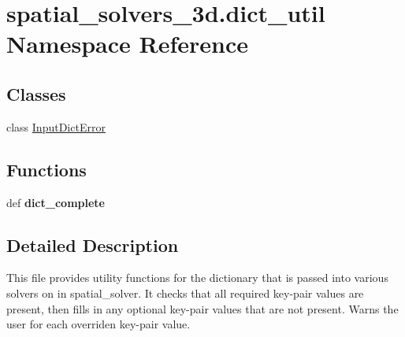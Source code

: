 \hypertarget{namespacespatial__solvers__3d_1_1dict__util}{\section{spatial\+\_\+solvers\+\_\+3d.\+dict\+\_\+util Namespace Reference}
\label{namespacespatial__solvers__3d_1_1dict__util}
}
\subsection*{Classes}
\begin{DoxyCompactItemize}
\item 
class \hyperlink{classspatial__solvers__3d_1_1dict__util_1_1_input_dict_error}{Input\+Dict\+Error}
\end{DoxyCompactItemize}
\subsection*{Functions}
\begin{DoxyCompactItemize}
\item 
\hypertarget{namespacespatial__solvers__3d_1_1dict__util_a516778afe95b5802406c43f47f0fd181}{def {\bfseries dict\+\_\+complete}}\label{namespacespatial__solvers__3d_1_1dict__util_a516778afe95b5802406c43f47f0fd181}

\end{DoxyCompactItemize}


\subsection{Detailed Description}
\begin{DoxyVerb}This file provides utility functions for the dictionary that is passed into various solvers on in spatial_solver.  It checks that all required key-pair values are present, then fills in any optional key-pair values that are not present.  Warns the user for each overriden key-pair value.\end{DoxyVerb}
 